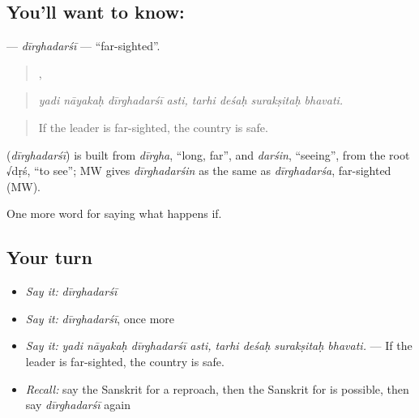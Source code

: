 \subsection*{You'll want to know: }
\textbf{} — \emph{dīrghadarśī} — \textquotedblleft{}far-sighted\textquotedblright{}.

\begin{quote}
   ,    
\end{quote}

\begin{quote}
\emph{yadi nāyakaḥ dīrghadarśī asti, tarhi deśaḥ surakṣitaḥ bhavati.}
\end{quote}

\begin{quote}
If the leader is far-sighted, the country is safe.
\end{quote}

\begin{cousinweb}
\textbf{} (\emph{dīrghadarśī}) is built from \emph{dīrgha}, \textquotedblleft{}long, far\textquotedblright{}, and \emph{darśin}, \textquotedblleft{}seeing\textquotedblright{}, from the root √dṛś, \textquotedblleft{}to see\textquotedblright{}; MW gives \emph{dīrghadarśin} as the same as \emph{dīrghadarśa}, far-sighted (MW).
\end{cousinweb}

\begin{grammarlens}[title={What you've built}]
One more word for saying what happens if.
\end{grammarlens}

\subsection*{Your turn}
\begin{itemize}
\raggedright
  \item \emph{Say it:} \emph{dīrghadarśī}
  \item \emph{Say it:} \emph{dīrghadarśī}, once more
  \item \emph{Say it:} \emph{yadi nāyakaḥ dīrghadarśī asti, tarhi deśaḥ surakṣitaḥ bhavati.} — If the leader is far-sighted, the country is safe.
  \item \emph{Recall:} say the Sanskrit for a reproach, then the Sanskrit for is possible, then say \emph{dīrghadarśī} again
\end{itemize}

